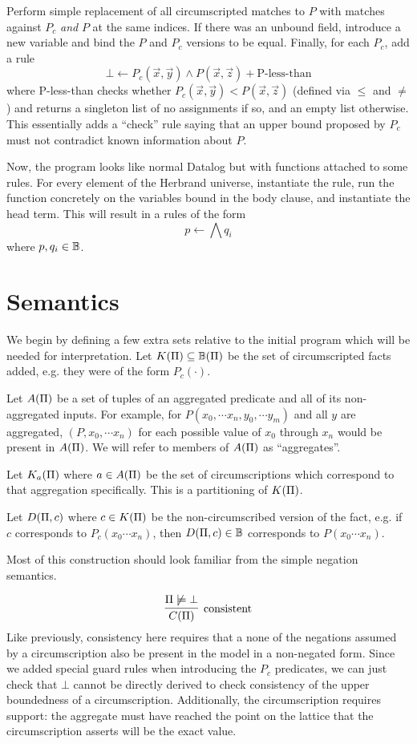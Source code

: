 Perform simple replacement of all circumscripted matches to $P$ with matches against $P_c$ \emph{and} $P$ at the same indices.
If there was an unbound field, introduce a new variable and bind the $P$ and $P_c$ versions to be equal.
Finally, for each $P_c$, add a rule
\[
	\bot \leftarrow P_c(\vec{x}, \vec{y}) \wedge P(\vec{x}, \vec{z}) + \textrm{P-less-than}
\]
where P-less-than checks whether $P_c(\vec{x}, \vec{y}) < P(\vec{x}, \vec{z})$ (defined via $\leq$ and $\neq$) and returns a singleton list of no assignments if so, and an empty list otherwise.
This essentially adds a ``check'' rule saying that an upper bound proposed by $P_c$ must not contradict known information about $P$.

Now, the program looks like normal Datalog but with functions attached to some rules.
For every element of the Herbrand universe, instantiate the rule, run the function concretely on the variables bound in the body clause, and instantiate the head term.
This will result in a rules of the form
\[
	p \leftarrow \bigwedge q_i
\]
where $p, q_i \in \mathbb{B}$.

\section{Semantics}
\label{formal:sec:semantics}
We begin by defining a few extra sets relative to the initial program which will be needed for interpretation.
Let $K(\Pi) \subseteq \mathbb{B}(\Pi)$ be the set of circumscripted facts added, e.g. they were of the form $P_c(\cdot)$.

Let $A(\Pi)$ be a set of tuples of an aggregated predicate and all of its non-aggregated inputs.
For example, for $P(x_0, \cdots x_n, y_0, \cdots y_m)$ and all $y$ are aggregated, $(P, x_0, \cdots x_n)$ for each possible value of $x_0$ through $x_n$ would be present in $A(\Pi)$.
We will refer to members of $A(\Pi)$ as ``aggregates''.

Let $K_a(\Pi)$ where $a \in A(\Pi)$ be the set of circumscriptions which correspond to that aggregation specifically.
This is a partitioning of $K(\Pi)$.

Let $D(\Pi, c)$ where $c \in K(\Pi)$ be the non-circumscribed version of the fact, e.g. if $c$ corresponds to $P_c(x_0 \cdots x_n)$, then $D(\Pi, c) \in \mathbb{B}$ corresponds to $P(x_0 \cdots x_n)$.

Most of this construction should look familiar from the simple negation semantics.

\[
	\infer[\textrm{consistent}]{\cons{\Pi}}{\Pi \not \models \bot}
\]
Like previously, consistency here requires that a none of the negations assumed by a circumscription also be present in the model in a non-negated form.
Since we added special guard rules when introducing the $P_c$ predicates, we can just check that $\bot$ cannot be directly derived to check consistency of the upper boundedness of a circumscription.
Additionally, the circumscription requires support: the aggregate must have reached the point on the lattice that the circumscription asserts will be the exact value.

